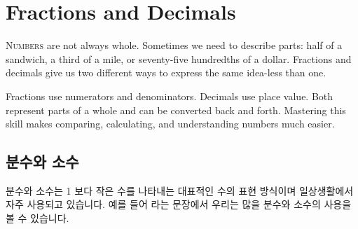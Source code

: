 \documentclass[12pt]{book}
\begin{document}
  \frontmatter
  \let\oldcleardoublepage\cleardoublepage
  \let\cleardoublepage\clearpage %
  
  
  \onesidedpaper
  \pagestyle{empty}
  
  
  
  \tableofcontents\pagestyle{plain}     %
  
  
  
  \pagestyle{empty}
  









  
  \mainmatter
  \let\cleardoublepage\oldcleardoublepage %
  \setlength{\parindent}{1.5em} %




  \onesidedpaper\chapter{Fractions and Decimals}                           \pagestyle{plain}
  \lettrine{N}{umbers} are not always whole. Sometimes we need to describe 
  parts: half of a sandwich, a third of a mile, or seventy-five hundredths 
  of a dollar. Fractions and decimals give us two different ways to 
  express the same idea-less than one.
  
  Fractions use numerators and denominators. Decimals use place value. 
  Both represent parts of a whole and can be converted back and forth. 
  Mastering this skill makes comparing, calculating, and understanding 
  numbers much easier.
  
  \section*{분수와 소수}
  분수와 소수는 1 보다 작은 수를 나타내는 대표적인 수의 표현 방식이며 일상생활에서 
  자주 사용되고 있습니다. 예를 들어  라는 문장에서 우리는 많을 
  분수와 소수의 사용을 볼 수 있습니다.
  
\end{document}
